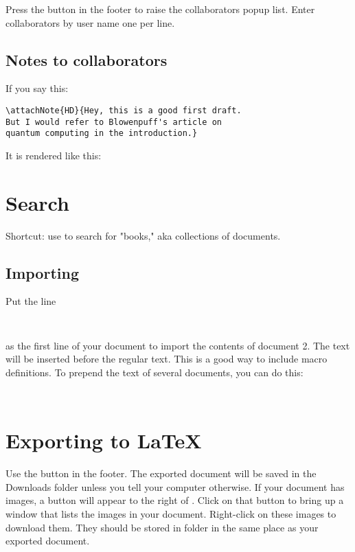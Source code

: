 Press the  button in the footer to raise the collaborators popup list.  Enter collaborators by user name one per line.


\subsection{Notes to collaborators}

If you say this:

\begin{verbatim}
\attachNote{HD}{Hey, this is a good first draft.  
But I would refer to Blowenpuff's article on 
quantum computing in the introduction.}
\end{verbatim}

It is rendered like this:


\section{Search}

Shortcut: use  to search for "books," aka collections of documents.


\subsection{Importing}

Put the line 

\begin{verbatim}
  
\end{verbatim}

as the first line of your document to import the contents of document 2.  The text will be inserted before the regular text.  This is a good way to include macro definitions.  To prepend the text of several documents, you can do this:

\begin{verbatim}
  
\end{verbatim}

\section{Exporting to LaTeX} 

Use the  button in the footer.  The exported document will be saved in the Downloads folder unless you tell your computer otherwise.  If your document has images, a button  will appear to the right of .  Click on that button to bring up a window that lists the images in your document.  Right-click on these images to download them.  They should be stored in folder  in the same place as your exported document.


